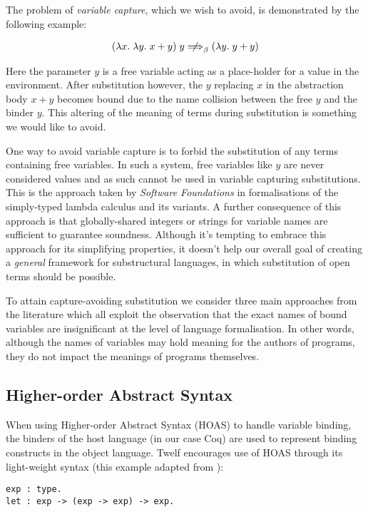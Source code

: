 \documentclass[]{unswthesis}
\let\i\textit
\begin{document}
The problem of \i{variable capture}, which we wish to avoid, is demonstrated by the following example:

\begin{eqnarray*}
(\lambda x. \; \lambda y. \; x + y) \; y \; {\centernot\Longrightarrow}_\beta \; (\lambda y. \; y + y)
\end{eqnarray*}

Here the parameter $y$ is a free variable acting as a place-holder for a value in the environment. After substitution however, the $y$ replacing $x$ in the abstraction body $x + y$ becomes bound due to the name collision between the free $y$ and the binder $y$. This altering of the meaning of terms during substitution is something we would like to avoid.

One way to avoid variable capture is to forbid the substitution of any terms containing free variables. In such a system, free variables like $y$ are never considered values and as such cannot be used in variable capturing substitutions. This is the approach taken by \i{Software Foundations} \cite{pierce15} in formalisations of the simply-typed lambda calculus and its variants. A further consequence of this approach is that globally-shared integers or strings for variable names are sufficient to guarantee soundness. Although it's tempting to embrace this approach for its simplifying properties, it doesn't help our overall goal of creating a \i{general} framework for substructural languages, in which substitution of open terms should be possible.

To attain capture-avoiding substitution we consider three main approaches from the literature which all exploit the observation that the exact names of bound variables are insignificant at the level of language formalisation. In other words, although the names of variables may hold meaning for the authors of programs, they do not impact the meanings of programs themselves.

\subsection{Higher-order Abstract Syntax}

When using Higher-order Abstract Syntax (HOAS) to handle variable binding, the binders of the host language (in our case Coq) are used to represent binding constructs in the object language. Twelf encourages use of HOAS through its light-weight syntax (this example adapted from \cite{twelf08}):

\begin{verbatim}
exp : type.
let : exp -> (exp -> exp) -> exp.
\end{verbatim}
\end{document}
